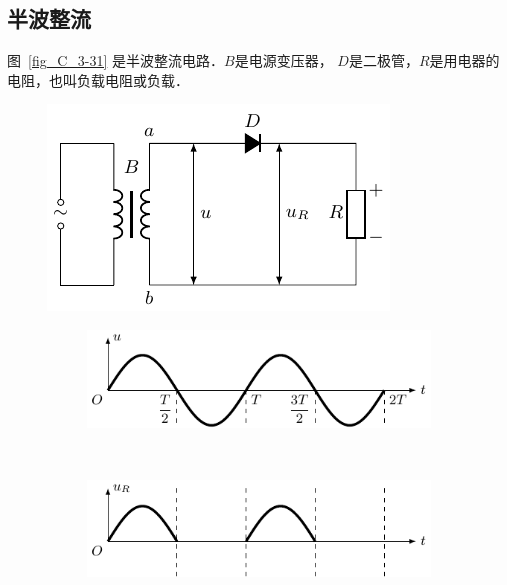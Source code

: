 \subsection{半波整流}

图~\ref{fig_C_3-31} 是半波整流电路．$B$是电源变压器，
$D$是二极管，$R$是用电器的电阻，也叫负载电阻或负载．
\begin{figure}[htbp]
    \centering
    \begin{minipage}[b]{0.43\linewidth}
    	\centering
    	 \includegraphics{fig/C/3-31.pdf}
    	 \begin{subfigure}{0.001\linewidth}%
    	 \end{subfigure}
    	\caption{}\label{fig_C_3-31}
    \end{minipage}
     \begin{minipage}[b]{0.54\linewidth}
    	\centering
    	\begin{subfigure}{0.99\linewidth}
    		\centering
    		\includegraphics{fig/C/3-32a.pdf}
    		\caption{}\label{fig_C_3-32a}
    	\end{subfigure}
    	\\
    	\begin{subfigure}{0.99\linewidth}
    		\centering
    		\includegraphics{fig/C/3-32b.pdf}

\end{subfigure}
\end{minipage}
\end{figure}
